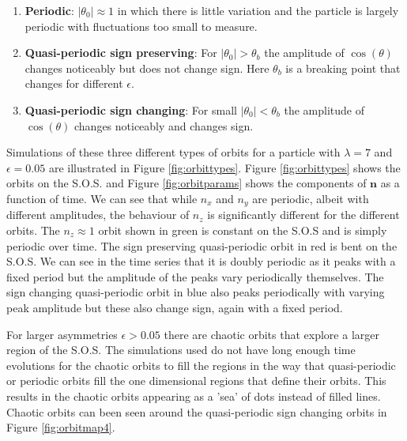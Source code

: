 \begin{enumerate}
\item \textbf{Periodic}: $\left|\theta_0\right| \approx 1$ in which there is little variation and the particle is largely periodic with fluctuations too small to measure.
\item \textbf{Quasi-periodic sign preserving}: For $\left|\theta_0\right|> \theta_b$ the amplitude of $\cos(\theta)$ changes noticeably but does not change sign. Here $\theta_b$ is a breaking point that changes for different $\epsilon$.
\item \textbf{Quasi-periodic sign changing}: For small $\left|\theta_0\right| < \theta_b$ the amplitude of $\cos(\theta)$ changes noticeably and changes sign. 
\end{enumerate}

Simulations of these three different types of orbits for a particle with $\lambda=7$ and $\epsilon=0.05$ are illustrated in Figure \ref{fig:orbittypes}. Figure \ref{fig:orbittypes} shows the orbits on the S.O.S. and Figure \ref{fig:orbitparams} shows the components of $\mathbf{n}$ as a function of time. We can see that while $n_x$ and $n_y$ are periodic, albeit with different amplitudes, the  behaviour of $n_z$ is significantly different for the different orbits. The $n_z \approx 1$  orbit shown in green is constant on the S.O.S and is simply periodic over time. The sign preserving quasi-periodic orbit in red is bent on the S.O.S. We can see in the time series that it is doubly periodic as it peaks with a fixed period but the amplitude of the peaks vary periodically themselves. The sign changing quasi-periodic orbit in blue also peaks periodically with varying peak amplitude but these also change sign, again with a fixed period.


For larger asymmetries $\epsilon > 0.05$ there are chaotic orbits that explore a larger region of the S.O.S. The simulations used do not have long enough time evolutions for the chaotic orbits to fill the regions in the way that quasi-periodic or periodic orbits fill the one dimensional regions that define their orbits. This results in the chaotic orbits appearing as a 'sea' of dots instead of filled lines. Chaotic orbits can been seen around the quasi-periodic sign changing orbits in Figure \ref{fig:orbitmap4}.

